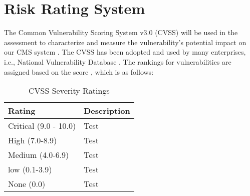 \chapter{Risk Rating System}
The Common Vulnerability Scoring System v3.0 (CVSS) will be used in the assessment to characterize and measure the vulnerability's potential impact on our CMS system \citep[p.~516]{cvss}. The CVSS has been adopted and used by many enterprises, i.e., National Vulnerability Database \citep{nist}. The rankings for vulnerabilities are assigned based on the score \citep{nvd_2022_vuln_calc}, which is as follows:

\begingroup
\centering
\setlength{\tabcolsep}{6.5pt} %
\renewcommand{\arraystretch}{1.8} %
\begin{longtable}{ |p{5cm}| p{10cm} |}
\caption{CVSS Severity Ratings}
    \label{table:spoofing}
\hline
\rowcolor{grey!15}
\textbf{Rating}  & \textbf{Description}\\
\hline
\cellcolor{red!95} Critical (9.0 - 10.0)  &  Test\\
\hline
\cellcolor{red!70} High (7.0-8.9)  &  Test\\
\hline
\hline
\cellcolor{yellow!95} Medium (4.0-6.9)  &  Test\\
\hline
\cellcolor{green!95} low (0.1-3.9)  &  Test\\
\hline
\cellcolor{grey!55} None (0.0)  &  Test\\
\hline
\end{longtable}
\endgroup